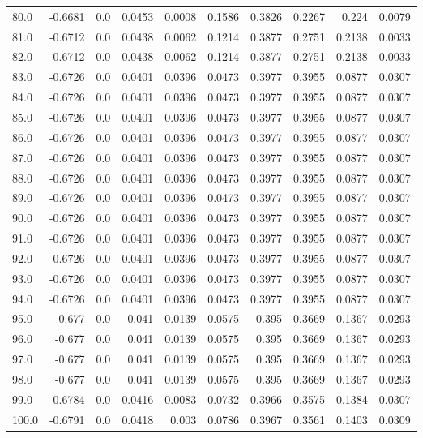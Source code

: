 \begin{longtable}{lrrrrrrrrr}
80.0 & -0.6681 & 0.0 & 0.0453 & 0.0008 & 0.1586 & 0.3826 & 0.2267 & 0.224 & 0.0079 \\
81.0 & -0.6712 & 0.0 & 0.0438 & 0.0062 & 0.1214 & 0.3877 & 0.2751 & 0.2138 & 0.0033 \\
82.0 & -0.6712 & 0.0 & 0.0438 & 0.0062 & 0.1214 & 0.3877 & 0.2751 & 0.2138 & 0.0033 \\
83.0 & -0.6726 & 0.0 & 0.0401 & 0.0396 & 0.0473 & 0.3977 & 0.3955 & 0.0877 & 0.0307 \\
84.0 & -0.6726 & 0.0 & 0.0401 & 0.0396 & 0.0473 & 0.3977 & 0.3955 & 0.0877 & 0.0307 \\
85.0 & -0.6726 & 0.0 & 0.0401 & 0.0396 & 0.0473 & 0.3977 & 0.3955 & 0.0877 & 0.0307 \\
86.0 & -0.6726 & 0.0 & 0.0401 & 0.0396 & 0.0473 & 0.3977 & 0.3955 & 0.0877 & 0.0307 \\
87.0 & -0.6726 & 0.0 & 0.0401 & 0.0396 & 0.0473 & 0.3977 & 0.3955 & 0.0877 & 0.0307 \\
88.0 & -0.6726 & 0.0 & 0.0401 & 0.0396 & 0.0473 & 0.3977 & 0.3955 & 0.0877 & 0.0307 \\
89.0 & -0.6726 & 0.0 & 0.0401 & 0.0396 & 0.0473 & 0.3977 & 0.3955 & 0.0877 & 0.0307 \\
90.0 & -0.6726 & 0.0 & 0.0401 & 0.0396 & 0.0473 & 0.3977 & 0.3955 & 0.0877 & 0.0307 \\
91.0 & -0.6726 & 0.0 & 0.0401 & 0.0396 & 0.0473 & 0.3977 & 0.3955 & 0.0877 & 0.0307 \\
92.0 & -0.6726 & 0.0 & 0.0401 & 0.0396 & 0.0473 & 0.3977 & 0.3955 & 0.0877 & 0.0307 \\
93.0 & -0.6726 & 0.0 & 0.0401 & 0.0396 & 0.0473 & 0.3977 & 0.3955 & 0.0877 & 0.0307 \\
94.0 & -0.6726 & 0.0 & 0.0401 & 0.0396 & 0.0473 & 0.3977 & 0.3955 & 0.0877 & 0.0307 \\
95.0 & -0.677 & 0.0 & 0.041 & 0.0139 & 0.0575 & 0.395 & 0.3669 & 0.1367 & 0.0293 \\
96.0 & -0.677 & 0.0 & 0.041 & 0.0139 & 0.0575 & 0.395 & 0.3669 & 0.1367 & 0.0293 \\
97.0 & -0.677 & 0.0 & 0.041 & 0.0139 & 0.0575 & 0.395 & 0.3669 & 0.1367 & 0.0293 \\
98.0 & -0.677 & 0.0 & 0.041 & 0.0139 & 0.0575 & 0.395 & 0.3669 & 0.1367 & 0.0293 \\
99.0 & -0.6784 & 0.0 & 0.0416 & 0.0083 & 0.0732 & 0.3966 & 0.3575 & 0.1384 & 0.0307 \\
100.0 & -0.6791 & 0.0 & 0.0418 & 0.003 & 0.0786 & 0.3967 & 0.3561 & 0.1403 & 0.0309 \\

\end{longtable}
